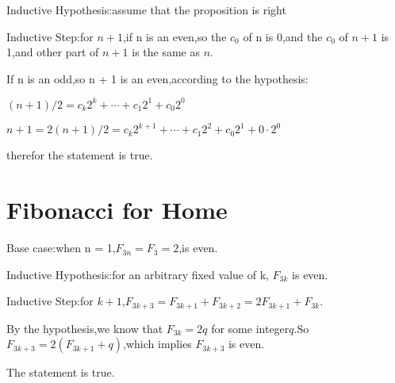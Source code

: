 \documentclass{article}
\begin{document}
	Inductive Hypothesis:assume that the proposition is right
	
	Inductive Step:for $n + 1$,if n is an even,so the $c_0$ of n is 0,and the $c_0$ of $n + 1$ is 1,and other part of $n + 1$ is the same as $n$.
	
	If n is an odd,so n + 1 is an even,according to the hypothesis:
	
	$(n+1)/2 = c_k 2^k + \cdots + c_1 2^1 + c_0 2^0$
	
	$n+1 = 2(n+1)/2 = c_k 2^{k+1} + \cdots + c_1 2^2 + c_0 2^1 + 0\cdot2^0$
	
	therefor the statement is true.
	\section{Fibonacci for Home}
	Base case:when n = 1,$F_{3n} = F_3 = 2$,is even.
	
	Inductive Hypothesis:for an arbitrary fixed value of k, $F_{3k}$ is even.
	
	Inductive Step:for $k+1$,$F_{3k+3} = F_{3k+1} + F_{3k+2} = 2F_{3k+1} + F_{3k}$.
	
	By the hypothesis,we know that $F_{3k} = 2q$ for some integer$q$.So $F_{3k+3} = 2(F_{3k+1} + q)$,which implies $F_{3k+3}$ is even.
	
	The statement is true.
\end{document}
